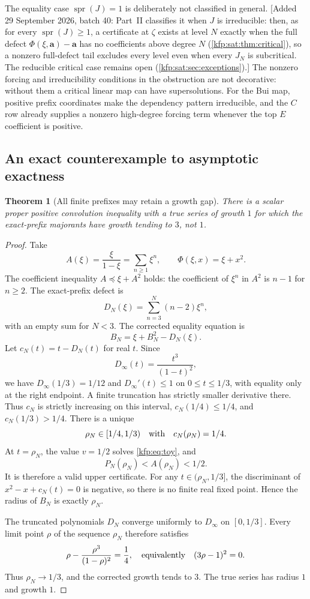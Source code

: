 \documentclass[11pt,a4paper]{article}
\newtheorem{theorem}{Theorem}[section]
\theoremstyle{definition}
\theoremstyle{remark}
\newcommand{\bA}{\boldsymbol a}
\newcommand{\spr}{\operatorname{spr}}
\begin{document}
The equality case $\spr(J)=1$ is deliberately not classified in general.
[Added 29 September 2026, batch 40: Part~II classifies it when $J$ is
irreducible: then, as for every $\spr(J)\geq1$, a certificate at $\zeta$
exists at level $N$ exactly when the full defect $\Phi(\xi,\bA)-\bA$ has no
coefficients above degree $N$ (\cref{kfp:sat:thm:critical}), so a nonzero
full-defect tail excludes every level even when every $J_N$ is subcritical.
The reducible critical case remains open (\cref{kfp:sat:sec:exceptions}).]
The nonzero forcing and irreducibility conditions in the obstruction are
not decorative: without them a critical linear map can have supersolutions.
For the Bui map, positive prefix coordinates make the dependency pattern
irreducible, and the $C$ row already supplies a nonzero high-degree forcing
term whenever the top $E$ coefficient is positive.

\subsection{An exact counterexample to asymptotic exactness}
\begin{theorem}[All finite prefixes may retain a growth gap]\label{kfp:thm:gap}
There is a scalar proper positive convolution inequality with a true series
of growth $1$ for which the exact-prefix majorants have growth tending to
$3$, not $1$.
\end{theorem}
\begin{proof}
Take
\[
 A(\xi)=\frac{\xi}{1-\xi}=\sum_{n\geq1}\xi^n,
 \qquad \Phi(\xi,x)=\xi+x^2.
\]
The coefficient inequality $A\preceq\xi+A^2$ holds: the coefficient of
$\xi^n$ in $A^2$ is $n-1$ for $n\geq2$.
The exact-prefix defect is
\[
 D_N(\xi)=\sum_{n=3}^N(n-2)\xi^n,
\]
with an empty sum for $N<3$. The corrected equality equation is
\begin{equation}\label{kfp:eq:toy}
 B_N=\xi+B_N^2-D_N(\xi).
\end{equation}
Let $c_N(t)=t-D_N(t)$ for real $t$.
Since
\[
 D_\infty(t)=\frac{t^3}{(1-t)^2},
\]
we have $D_\infty(1/3)=1/12$ and
$D_\infty'(t)\leq1$ on $0\leq t\leq1/3$, with equality only at the
right endpoint. A finite truncation has strictly smaller derivative there.
Thus $c_N$ is strictly increasing on this interval,
$c_N(1/4)\leq1/4$, and $c_N(1/3)>1/4$.
There is a unique
\[
 \rho_N\in[1/4,1/3)\quad\hbox{with}\quad c_N(\rho_N)=1/4.
\]
At $t=\rho_N$, the value $v=1/2$ solves \eqref{kfp:eq:toy}, and
\[
 P_N(\rho_N)<A(\rho_N)<1/2.
\]
It is therefore a valid upper certificate. For any
$t\in(\rho_N,1/3]$, the discriminant of
$x^2-x+c_N(t)=0$ is negative, so there is no finite real fixed point.
Hence the radius of $B_N$ is exactly $\rho_N$.

The truncated polynomials $D_N$ converge uniformly to $D_\infty$ on
$[0,1/3]$. Every limit point $\rho$ of the sequence $\rho_N$ therefore
satisfies
\[
 \rho-\frac{\rho^3}{(1-\rho)^2}=\frac14,
 \quad\hbox{equivalently}\quad (3\rho-1)^2=0.
\]
Thus $\rho_N\to1/3$, and the corrected growth tends to $3$.
The true series has radius $1$ and growth $1$.
\end{proof}
\end{document}

